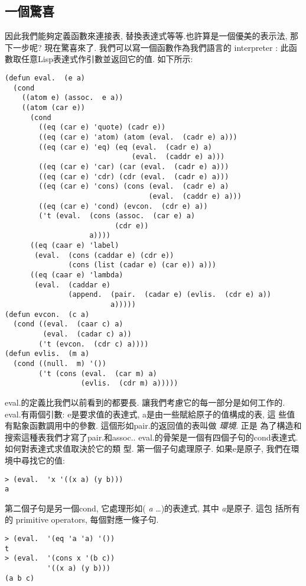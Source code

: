 \documentclass[12pt]{article}
\begin{document}
\begin{CJK}{UTF8}{bsmi}
\section{一個驚喜} 
因此我們能夠定義函數來連接表, 替換表達式等等.也許算是一個優美的表示法, 
那下一步呢? 
現在驚喜來了. 
我們可以寫一個函數作為我們語言的 interpreter : 此函數取任意Lisp表達式作引數並返回它的值. 
如下所示: 
\begin{verbatim} 
(defun eval.  (e a) 
  (cond 
    ((atom e) (assoc.  e a)) 
    ((atom (car e)) 
      (cond 
        ((eq (car e) 'quote) (cadr e)) 
        ((eq (car e) 'atom) (atom (eval.  (cadr e) a))) 
        ((eq (car e) 'eq) (eq (eval.  (cadr e) a) 
                              (eval.  (caddr e) a))) 
        ((eq (car e) 'car) (car (eval.  (cadr e) a))) 
        ((eq (car e) 'cdr) (cdr (eval.  (cadr e) a))) 
        ((eq (car e) 'cons) (cons (eval.  (cadr e) a) 
                                  (eval.  (caddr e) a))) 
        ((eq (car e) 'cond) (evcon.  (cdr e) a)) 
        ('t (eval.  (cons (assoc.  (car e) a) 
                          (cdr e)) 
                    a)))) 
      ((eq (caar e) 'label) 
       (eval.  (cons (caddar e) (cdr e)) 
               (cons (list (cadar e) (car e)) a))) 
      ((eq (caar e) 'lambda) 
       (eval.  (caddar e) 
               (append.  (pair.  (cadar e) (evlis.  (cdr e) a)) 
                         a))))) 
(defun evcon.  (c a) 
  (cond ((eval.  (caar c) a) 
         (eval.  (cadar c) a)) 
        ('t (evcon.  (cdr c) a)))) 
(defun evlis.  (m a) 
  (cond ((null.  m) '()) 
        ('t (cons (eval.  (car m) a) 
                  (evlis.  (cdr m) a))))) 
\end{verbatim} 
eval.的定義比我們以前看到的都要長. 
讓我們考慮它的每一部分是如何工作的. 
eval.有兩個引數: 
e是要求值的表達式, 
a是由一些賦給原子的值構成的表, 這 
些值有點象函數調用中的參數. 
這個形如pair.的返回值的表叫做{\em 
環境}. 
正是 
為了構造和搜索這種表我們才寫了pair.和assoc.. 
eval.的骨架是一個有四個子句的cond表達式. 
如何對表達式求值取決於它的類 
型. 
第一個子句處理原子. 
如果e是原子, 
我們在環境中尋找它的值: 
\begin{verbatim} 
> (eval.  'x '((x a) (y b))) 
a 
\end{verbatim} 
第二個子句是另一個cond, 
它處理形如({\it 
a} 
\dots)的表達式, 
其中{\it 
a}是原子. 
這包 
括所有的 primitive operators, 
每個對應一條子句. 
\begin{verbatim} 
> (eval.  '(eq 'a 'a) '()) 
t 
> (eval.  '(cons x '(b c)) 
          '((x a) (y b))) 
(a b c) 
\end{verbatim} 

\end{CJK}
\end{document}
